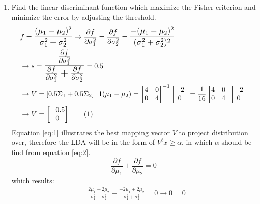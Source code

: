 \documentclass[12pt]{article}
\newcommand\numberthis{\addtocounter{equation}{1}\tag{\theequation}}
\begin{document}
\begin{enumerate}
\item Find the linear discriminant function which maximize the Fisher criterion and
minimize the error by adjusting the threshold.\\
\begin{align*}
&f = \mathlarger{\frac{(\mu_1 - \mu_2)^2}{\sigma_1^2 + \sigma_2^2}} \rightarrow \frac{\partial f}{\partial \sigma_1^2} =  \frac{\partial f}{\partial \sigma_2^2} = \mathlarger{\frac{-(\mu_1 - \mu_2)^2}{(\sigma_1^2 + \sigma_2^2)^2}} \\
&\rightarrow s = \mathlarger{\mathlarger{\frac{\frac{\partial f}{\partial \sigma_1^2}}{\frac{\partial f}{\partial \sigma_1^2} + \frac{\partial f}{\partial \sigma_2^2}}}} = 0.5\\
&\rightarrow V = [0.5 \Sigma_1 + 0.5 \Sigma_2]^-1 (\mu_1 - \mu_2) = \left[\begin{matrix}
4 & 0\\
0 & 4
\end{matrix}
\right]^{-1} \left[ \begin{matrix}
-2 \\
0
\end{matrix} \right] = \frac{1}{16} \left[ \begin{matrix}
4 & 0 \\
0 & 4
\end{matrix} \right] \left[ \begin{matrix}
-2 \\
0
\end{matrix} \right] \\ 
&\rightarrow V = \left[ \begin{matrix}
-0.5\\0
\end{matrix}\right] \numberthis \label{eq:1}
\end{align*}
Equation \eqref{eq:1} illustrates the best mapping vector $V$ to project distribution over, therefore the LDA will be in the form of $V^t x \geq \alpha$, in which $\alpha$ should be find from equation \eqref{eq:2}.
\begin{equation}
\frac{\partial f}{\partial \mu_1} + \frac{\partial f}{\partial \mu_2} = 0
\label{eq:2}
\end{equation}
which results:
\begin{align*}
&\frac{2\mu_1 - 2\mu_2}{\sigma_1^2 + \sigma_2^2} + \frac{- 2\mu_1 + 2\mu_2}{\sigma_1^2 + \sigma_2^2} = 0 \rightarrow 0 = 0
\end{align*}

\end{enumerate}
\end{document}
